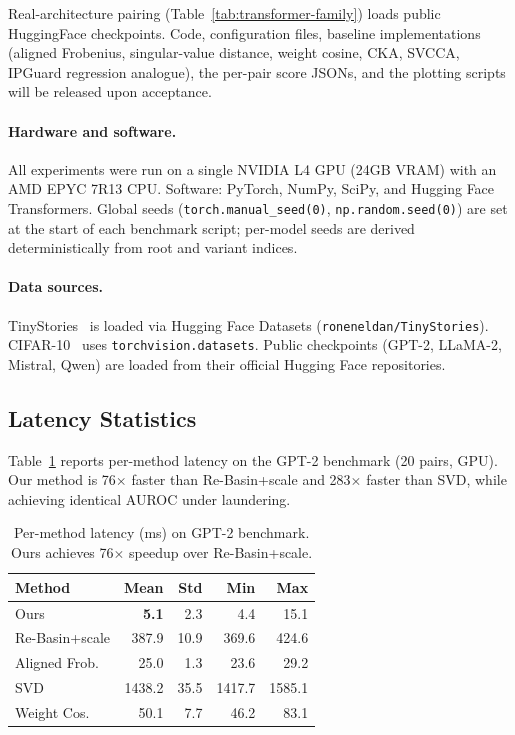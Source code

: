 Real-architecture pairing (Table~\ref{tab:transformer-family}) loads public HuggingFace checkpoints. Code, configuration files, baseline implementations (aligned Frobenius, singular-value distance, weight cosine, CKA, SVCCA, IPGuard regression analogue), the per-pair score JSONs, and the plotting scripts will be released upon acceptance.

\paragraph{Hardware and software.} All experiments were run on a single NVIDIA L4 GPU (24GB VRAM) with an AMD EPYC 7R13 CPU. Software: PyTorch, NumPy, SciPy, and Hugging Face Transformers. Global seeds (\texttt{torch.manual\_seed(0)}, \texttt{np.random.seed(0)}) are set at the start of each benchmark script; per-model seeds are derived deterministically from root and variant indices.

\paragraph{Data sources.} TinyStories~\citep{eldan2023tinystories} is loaded via Hugging Face Datasets (\texttt{roneneldan/TinyStories}). CIFAR-10~\citep{krizhevsky2009cifar} uses \texttt{torchvision.datasets}. Public checkpoints (GPT-2, LLaMA-2, Mistral, Qwen) are loaded from their official Hugging Face repositories.

\subsection{Latency Statistics}\label{app:latency}

Table~\ref{tab:gpt2-latency} reports per-method latency on the GPT-2 benchmark (20 pairs, GPU). Our method is 76$\times$ faster than Re-Basin+scale and 283$\times$ faster than SVD, while achieving identical AUROC under laundering.

\begin{table}[h]
\centering
\small
\setlength{\tabcolsep}{4pt}
\begin{tabular}{@{}lrrrr@{}}
\toprule
Method & Mean & Std & Min & Max \\
\midrule
Ours & \textbf{5.1} & 2.3 & 4.4 & 15.1 \\
Re-Basin+scale & 387.9 & 10.9 & 369.6 & 424.6 \\
Aligned Frob.\ & 25.0 & 1.3 & 23.6 & 29.2 \\
SVD & 1438.2 & 35.5 & 1417.7 & 1585.1 \\
Weight Cos.\ & 50.1 & 7.7 & 46.2 & 83.1 \\
\bottomrule
\end{tabular}
\caption{Per-method latency (ms) on GPT-2 benchmark. Ours achieves 76$\times$ speedup over Re-Basin+scale.}
\label{tab:gpt2-latency}
\end{table}


